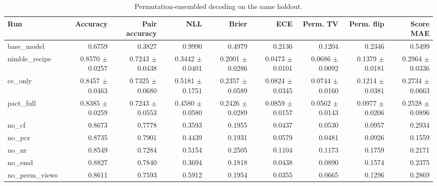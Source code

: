 \begin{table}[t]
\centering
\begin{tabular}{lrrrrrrrr}
\toprule
Run & Accuracy & Pair accuracy & NLL & Brier & ECE & Perm. TV & Perm. flip & Score MAE \\
\midrule
base\_model & 0.6759 & 0.3827 & 0.9990 & 0.4979 & 0.2136 & 0.1204 & 0.2346 & 0.5499 \\
nimble\_recipe & 0.8570 $\pm$ 0.0257 & 0.7243 $\pm$ 0.0438 & 0.3442 $\pm$ 0.0401 & 0.2001 $\pm$ 0.0286 & 0.0473 $\pm$ 0.0101 & 0.0686 $\pm$ 0.0092 & 0.1379 $\pm$ 0.0181 & 0.2964 $\pm$ 0.0336 \\
ce\_only & 0.8457 $\pm$ 0.0463 & 0.7325 $\pm$ 0.0680 & 0.5181 $\pm$ 0.1751 & 0.2357 $\pm$ 0.0589 & 0.0824 $\pm$ 0.0345 & 0.0744 $\pm$ 0.0160 & 0.1214 $\pm$ 0.0381 & 0.2734 $\pm$ 0.0663 \\
pact\_full & 0.8385 $\pm$ 0.0259 & 0.7243 $\pm$ 0.0553 & 0.4580 $\pm$ 0.0580 & 0.2426 $\pm$ 0.0289 & 0.0859 $\pm$ 0.0157 & 0.0562 $\pm$ 0.0143 & 0.0977 $\pm$ 0.0206 & 0.2528 $\pm$ 0.0896 \\
no\_cf & 0.8673 & 0.7778 & 0.3593 & 0.1955 & 0.0437 & 0.0530 & 0.0957 & 0.2934 \\
no\_pcr & 0.8735 & 0.7901 & 0.4439 & 0.1931 & 0.0579 & 0.0481 & 0.0926 & 0.1559 \\
no\_nr & 0.8549 & 0.7284 & 0.5154 & 0.2505 & 0.1104 & 0.1173 & 0.1759 & 0.2171 \\
no\_emd & 0.8827 & 0.7840 & 0.3694 & 0.1818 & 0.0438 & 0.0890 & 0.1574 & 0.2375 \\
no\_perm\_views & 0.8611 & 0.7593 & 0.5912 & 0.1954 & 0.0355 & 0.0665 & 0.1296 & 0.2869 \\
\bottomrule
\end{tabular}
\caption{Permutation-ensembled decoding on the same holdout.}
\label{tab:ensemble}
\end{table}
